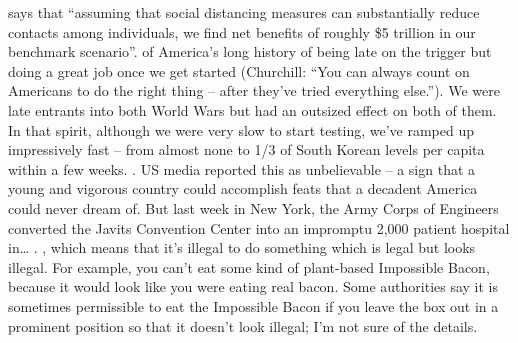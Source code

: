 \begin{xmlentries}
\begin{xmlentriescontent}
{   says that “assuming that social distancing measures can substantially reduce contacts among individuals, we find net benefits of roughly \$5 trillion in our benchmark scenario”.
 \htmlp {}
 \htmlp {} of America’s long history of being late on the trigger but doing a great job once we get started (Churchill: “You can always count on Americans to do the right thing – after they’ve tried everything else.”). We were late entrants into both World Wars but had an outsized effect on both of them. In that spirit, although we were very slow to start testing, we’ve ramped up impressively fast – from almost none to 1/3 of South Korean levels per capita within a few weeks. 
  . US media reported this as unbelievable – a sign that a young and vigorous country could accomplish feats that a decadent America could never dream of. But last week in New York, the Army Corps of Engineers converted the Javits Convention Center into an impromptu 2,000 patient hospital in… . 
 \htmlp {}
   , which means that it’s illegal to do something which is legal but looks illegal. For example, you can’t eat some kind of plant-based Impossible Bacon, because it would look like you were eating real bacon. Some authorities say it is sometimes permissible to eat the Impossible Bacon if you leave the box out in a prominent position so that it doesn’t look illegal; I’m not sure of the details.
}
\end{xmlentriescontent}
\end{xmlentries}
